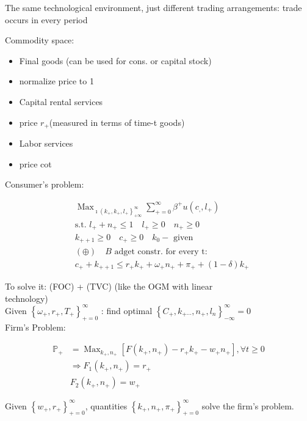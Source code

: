 \documentclass[10pt]{article}
\begin{document}
The same technological environment, just different trading arrangements: trade occurs in every period

Commodity space:

\begin{itemize}
  \item Final goods (can be used for cons. or capital stock)
  \item normalize price to 1
  \item Capital rental services
  \item price $r_{+}$(measured in terms of time-t goods)
  \item Labor services
  \item price cot
\end{itemize}

Consumer's problem:

$$
\begin{aligned}
& \operatorname{Max}_{\imath\left(k_{+}, k_{+}, l_{+}\right\}_{+\infty}^{\infty}} \sum_{+=0}^{\infty} \beta^{+} u\left(c_{,}, l_{+}\right) \\
& \text {s.t. } l_{+}+n_{+} \leq 1 \quad l_{+} \geq 0 \quad n_{+} \geq 0 \\
& k_{++1} \geq 0 \quad c_{+} \geq 0 \quad k_{0}-\text { given } \\
& (\oplus) \quad B \text { adget constr. for every t: } \\
& c_{+}+k_{++1} \leq r_{+} k_{+}+\omega_{+} n_{+}+\pi_{+}+(1-\delta) k_{+}
\end{aligned}
$$

To solve it: (FOC) + (TVC) (like the OGM with linear\\
technology)\\
Given $\left\{\omega_{+}, r_{+}, T_{+}\right\}_{+=0}^{\infty}$ : find optimal $\left\{C_{+}, k_{+\cdots}, n_{+}, l_{n}\right\}_{-\infty}^{\infty}=0$\\
Firm's Problem:

$$
\begin{aligned}
\mathbb{P}_{+} & =\operatorname{Max}_{k_{+}, n_{+}}\left[F\left(k_{+}, n_{+}\right)-r_{+} k_{+}-w_{+} n_{+}\right], \forall t \geq 0 \\
& \Rightarrow F_{1}\left(k_{+}, n_{+}\right)=r_{+} \\
& F_{2}\left(k_{+}, n_{+}\right)=w_{+}
\end{aligned}
$$

Given $\left\{w_{+}, r_{+}\right\}_{+=0}^{\infty}$, quantities $\left\{k_{+}, n_{+}, \pi_{+}\right\}_{+=0}^{\infty}$ solve the firm's problem.
\end{document}
